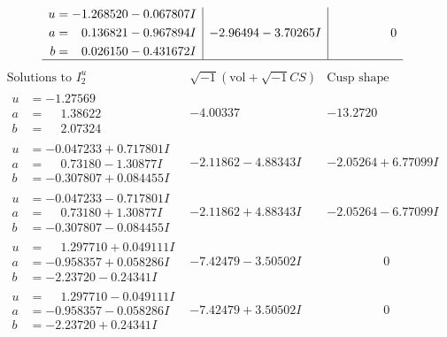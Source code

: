 \documentclass[1p]{elsarticle_modified}
\theoremstyle{definition}
\newcommand{\I}{\sqrt{-1}}
\begin{document}
$$\begin{array}{c|c|c}
\begin{aligned}
u &= -1.268520 - 0.067807 I \\
a &= \phantom{-}0.136821 - 0.967894 I \\
b &= \phantom{-}0.026150 - 0.431672 I\end{aligned}
 & -2.96494 - 3.70265 I & \phantom{-0.000000 } 0\\
 \hline 
 \end{array}$$\newpage$$\begin{array}{c|c|c}  
\text{Solutions to }I^u_{2}& \I (\text{vol} + \sqrt{-1}CS) & \text{Cusp shape}\\
 \hline 
\begin{aligned}
u &= -1.27569\phantom{ +0.000000I} \\
a &= \phantom{-}1.38622\phantom{ +0.000000I} \\
b &= \phantom{-}2.07324\phantom{ +0.000000I}\end{aligned}
 & -4.00337\phantom{ +0.000000I} & -13.2720\phantom{ +0.000000I} \\ \hline\begin{aligned}
u &= -0.047233 + 0.717801 I \\
a &= \phantom{-}0.73180 - 1.30877 I \\
b &= -0.307807 + 0.084455 I\end{aligned}
 & -2.11862 - 4.88343 I & -2.05264 + 6.77099 I \\ \hline\begin{aligned}
u &= -0.047233 - 0.717801 I \\
a &= \phantom{-}0.73180 + 1.30877 I \\
b &= -0.307807 - 0.084455 I\end{aligned}
 & -2.11862 + 4.88343 I & -2.05264 - 6.77099 I \\ \hline\begin{aligned}
u &= \phantom{-}1.297710 + 0.049111 I \\
a &= -0.958357 + 0.058286 I \\
b &= -2.23720 - 0.24341 I\end{aligned}
 & -7.42479 - 3.50502 I & \phantom{-0.000000 } 0 \\ \hline\begin{aligned}
u &= \phantom{-}1.297710 - 0.049111 I \\
a &= -0.958357 - 0.058286 I \\
b &= -2.23720 + 0.24341 I\end{aligned}
 & -7.42479 + 3.50502 I & \phantom{-0.000000 } 0 \\ \hline\begin{aligned}

\end{aligned}
\end{array}$$
\end{document}
